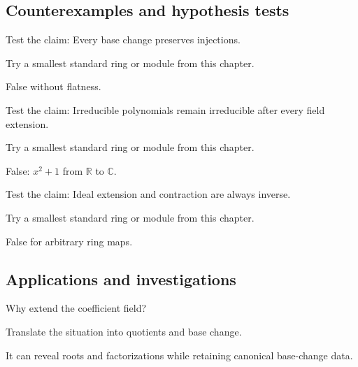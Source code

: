 \subsection*{Counterexamples and hypothesis tests}

\begin{exercise}[Injectivity]\label{exr:v11-expand-10}
Test the claim: Every base change preserves injections.
\end{exercise}
\begin{hint}
Try a smallest standard ring or module from this chapter.
\end{hint}
\begin{solution}
False without flatness.
\end{solution}

\begin{exercise}[Irreducibility]\label{exr:v11-expand-11}
Test the claim: Irreducible polynomials remain irreducible after every field extension.
\end{exercise}
\begin{hint}
Try a smallest standard ring or module from this chapter.
\end{hint}
\begin{solution}
False: $x^2+1$ from $\mathbb R$ to $\mathbb C$.
\end{solution}

\begin{exercise}\label{exr:v11-expand-12}
Test the claim: Ideal extension and contraction are always inverse.
\end{exercise}
\begin{hint}
Try a smallest standard ring or module from this chapter.
\end{hint}
\begin{solution}
False for arbitrary ring maps.
\end{solution}

\subsection*{Applications and investigations}

\begin{exercise}\label{exr:v11-expand-13}
Why extend the coefficient field?
\end{exercise}
\begin{hint}
Translate the situation into quotients and base change.
\end{hint}
\begin{solution}
It can reveal roots and factorizations while retaining canonical base-change data.
\end{solution}

